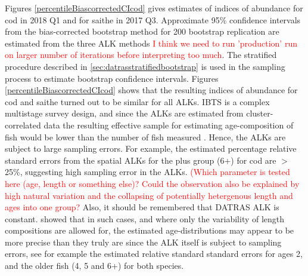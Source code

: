 \documentclass[a4paper 12pt]{article}
\numberwithin{equation}{section}
\newcommand{\ed}[1]{\textcolor{red}{#1}}
\begin{document}
Figures \ref{percentileBiascorrectedCIcod} gives estimates of indices of abundance for cod in  2018 Q1 and for saithe in  2017 Q3. Approximate 95\% confidence intervals from the bias-corrected bootstrap method for 200 bootstrap replication are estimated from the three ALK methods \ed{I think we need to run 'production' run on larger number of iterations before interpreting too much}. The stratified procedure described in \ref{sec:datrasstratifiedbootstrap} is used in the sampling process to estimate bootstrap confidence intervals.   Figures \ref{percentileBiascorrectedCIcod}  shows that the resulting indices of abundance for cod and saithe turned out to be similar for all ALKs. IBTS is a complex multistage survey design, and since the ALKs are estimated from cluster-correlated data the resulting effective sample for estimating age-composition of fish would be lower than the number of fish measured \citep{ICES2013PICS3}. Hence, the ALKs are subject to large sampling errors. For example, the estimated percentage relative standard errors from the spatial ALKs for the plus group (6+) for cod are $>$ 25\%, suggesting high sampling error in the ALKs. \ed{(Which parameter is tested here (age, length or something else)? Could the observation also be explained by high natural variation and the collapsing of potentially hetergenous length and ages into one group?} Also, it should be remembered that DATRAS ALK is constant.   \citet{aanes2015efficient} showed that in such cases, and where only the variability of  length compositions are allowed for, the estimated age-distributions may appear to be more precise than they truly are since the ALK itself is subject to sampling errors, see for example the estimated relative standard standard errors for ages 2, and the older fish (4, 5 and 6+) for both species. 

\clearpage
\end{document}
